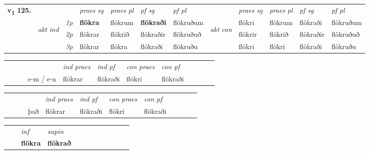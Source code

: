 \begin{tabular}{llllllllllll} \toprule
\multirow{4}{*}{{{\textbf{v{\textsubscript{1}}} \Large{\textbf{125.}}}}}  & &   &  \textit{praes sg}  & \textit{praes pl}  &\textit{ pf sg} & \textit{pf pl} &  &  \textit{praes sg}  & \textit{praes pl}  & \textit{pf sg} & \textit{pf pl } \\*
	\cmidrule{4-7} \cmidrule{9-12}
 & \multirow{3}{*}{\begin{turn}{90}\textit{akt ind}\end{turn}} & {\textit{1p}} & \textbf{flökra} & flökrum    & \textbf{flökraði} & flökruðum & \multirow{3}{*}{\begin{turn}{90}\textit{akt con}\end{turn}} &flökri & flökrum & flökraði & flökruðum\\*
& &  {\textit{2p}} &  flökrar  & flökrið   & flökraðir & flökruðuð & & flökrir & flökrið & flökraðir & flökruðuð \\*
& &  {\textit{3p}} & flökrar & flökra   & flökraði & flökruðu & & flökri & flökri& flökraði & flökruðu  \\*
\cmidrule{4-7} \cmidrule{9-12}
\end{tabular}


\begin{tabular}{llllllllllll}
 & &  & &  \textit{ind praes} & \textit{ind pf} & \textit{con praes} & \textit{con pf} \\*
&  & & e-m / e-n & flökrar & flökraði & flökri & flökraði \\*
\cmidrule{5-9}
\end{tabular}


\begin{tabular}{llllllllllll}
 & &  & &  \textit{ind praes} & \textit{ind pf} & \textit{con praes} & \textit{con pf} \\*
&  & & það & flökrar & flökraði & flökri & flökraði \\*
\cmidrule{5-9}
\end{tabular}


\begin{tabular}{llllllllllll}
 & & \textit{inf}      & \textit{supin}       \\*
  & & \textbf{flökra}       &  \textbf{flökrað}   \\*
\cmidrule{1-12}
\end{tabular}




